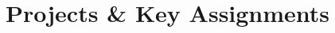 \documentclass[11.9pt,a4paper,sans, colorlinks=false, linkcolor=cyan]{moderncv}
\renewcommand*{\cventry}[7][.25em]{%
  \cvitem[#1]{#2}{%
    {\bfseries#3}%
    \ifthenelse{\equal{#4}{}}{}{ {\slshape#4}}%
    \ifthenelse{\equal{#5}{}}{}{ #5}%
    \ifthenelse{\equal{#6}{}}{}{ #6}%
    \strut%
    \ifx&#7&%
      \else{{}\begin{minipage}[t]{\linewidth}\small#7\end{minipage}}\fi}}
\begin{document}
\section{Projects \& Key Assignments}
%
\end{document}
